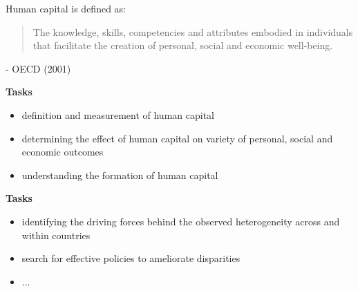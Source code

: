 
\begin{frame}
Human capital is defined as:
\vspace{\baselineskip}

\begin{quote}
The knowledge, skills, competencies and attributes embodied in individuals that facilitate
the creation of personal, social and economic well-being.
\end{quote}\vspace{-0.5pt} \hspace{6cm} - OECD (2001)
\end{frame}
\begin{frame}
\textbf{Tasks}\vspace{0.3cm}

\begin{itemize}\setlength\itemsep{1em}
\item definition and measurement of human capital
\item determining the effect of human capital on variety of personal, social and economic outcomes
\item understanding the formation of human capital
\end{itemize}
\end{frame}
\begin{frame}
\textbf{Tasks}\vspace{0.3cm}

\begin{itemize}\setlength\itemsep{1em}
\item identifying the driving forces behind the observed heterogeneity across and within countries
\item search for effective policies to ameliorate disparities
\item $\hdots$
\end{itemize}
\end{frame}
